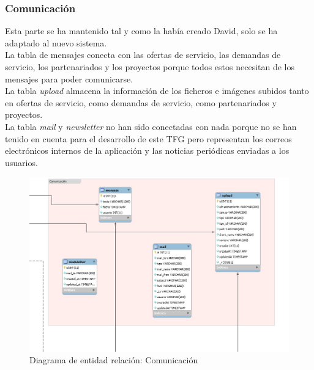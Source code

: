 \documentclass[11pt]{article}
\begin{document}
\subsubsection{Comunicación}
Esta parte se ha mantenido tal y como la había creado David, solo se ha adaptado al nuevo sistema.\\
La tabla de mensajes conecta con las ofertas de servicio, las demandas de servicio, los partenariados y los proyectos porque todos estos necesitan de los mensajes para poder comunicarse.\\
La tabla \textit{upload} almacena la información de los ficheros e imágenes subidos tanto en ofertas de servicio, como demandas de servicio, como partenariados y proyectos.\\
La tabla \textit{mail} y \textit{newsletter} no han sido conectadas con nada porque no se han tenido en cuenta para el desarrollo de este TFG pero representan los correos electrónicos internos de la aplicación y las noticias periódicas enviadas a los usuarios.
\begin{figure}
	\centering
	\includegraphics[scale=0.4]{comunicacion}
	\caption{Diagrama de entidad relación: Comunicación}
\end{figure}
\end{document}
